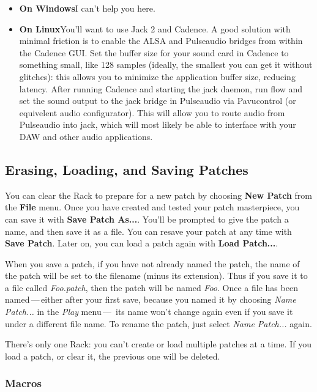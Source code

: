 \documentclass{article}
\begin{document}
\begin{itemize}
\item {\bf On Windows}\quad I can't help you here.

\item {\bf On Linux}\quad You'll want to use Jack 2 and Cadence. A good solution with minimal friction is to enable the ALSA and Pulseaudio bridges from within the Cadence GUI. Set the buffer size for your sound card in Cadence to something small, like 128 samples (ideally, the smallest you can get it without glitches): this allows you to minimize the application buffer size, reducing latency. After running Cadence and starting the jack daemon, run flow and set the sound output to the jack bridge in Pulseaudio via Pavucontrol (or equivelent audio configurator). This will allow you to route audio from Pulseaudio into jack, which will most likely be able to interface with your DAW and other audio applications.

\end{itemize}

\subsection{Erasing, Loading, and Saving Patches}

You can clear the Rack to prepare for a new patch by choosing {\bf New Patch} from the {\bf File} menu.  Once you have created and tested your patch masterpiece, you can save it with {\bf Save Patch As...}.  You'll be prompted to give the patch a name, and then save it as a file.   You can resave your patch at any time with {\bf Save Patch}.  Later on, you can load a patch again with {\bf Load Patch...}.

When you save a patch, if you have not already named the patch, the name of the patch will be set to the filename (minus its extension).  Thus if you save it to a file called {\it Foo.patch}, then the patch will be named {\it Foo}.  Once a file has been named\,---\,either after your first save, because you named it by choosing {\it Name Patch...} in the {\it Play} menu\,---\, its name won't change again even if you save it under a different file name.  To rename the patch, just select {\it Name Patch...} again.

There's only one Rack: you can't create or load multiple patches at a time.  If you load a patch, or clear it, the previous one will be deleted.

\subsubsection{Macros}
\label{aboutmacros}
\end{document}
